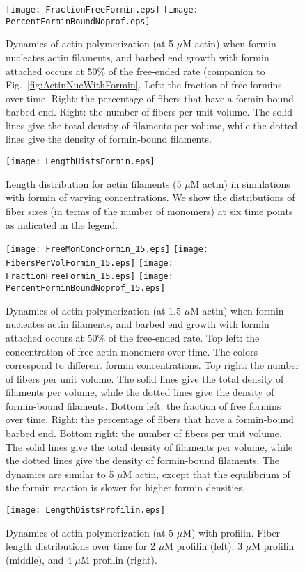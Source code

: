 \documentclass[11pt]{article}
\begin{document}
\begin{appendices}
\begin{figure}
\centering
\texttt{[image: FractionFreeFormin.eps]}
\texttt{[image: PercentForminBoundNoprof.eps]}
\caption{Dynamics of actin polymerization (at 5 $\mu$M actin) when formin nucleates actin filaments, and barbed end growth with formin attached occurs at 50\% of the free-ended rate (companion to Fig.\ \ref{fig:ActinNucWithFormin}. Left: the fraction of free formins over time. Right: the percentage of fibers that have a formin-bound barbed end. Right: the number of fibers per unit volume. The solid lines give the total density of filaments per volume, while the dotted lines give the density of formin-bound filaments.}
\end{figure}


\begin{figure}
\centering
\texttt{[image: LengthHistsFormin.eps]}
\caption{\label{fig:HistsWithFormin}Length distribution for actin filaments (5 $\mu$M actin) in simulations with formin of varying concentrations. We show the distributions of fiber sizes (in terms of the number of monomers) at six time points as indicated in the legend.}
\end{figure}

\begin{figure}
\centering
\texttt{[image: FreeMonConcFormin\_15.eps]}
\texttt{[image: FibersPerVolFormin\_15.eps]}
\texttt{[image: FractionFreeFormin\_15.eps]}
\texttt{[image: PercentForminBoundNoprof\_15.eps]}
\caption{\label{fig:ActinLowNucWithFormin}Dynamics of actin polymerization (at 1.5 $\mu$M actin) when formin nucleates actin filaments, and barbed end growth with formin attached occurs at 50\% of the free-ended rate. Top left: the concentration of free actin monomers over time. The colors correspond to different formin concentrations. Top right: the number of fibers per unit volume. The solid lines give the total density of filaments per volume, while the dotted lines give the density of formin-bound filaments. Bottom left: the fraction of free formins over time. Right: the percentage of fibers that have a formin-bound barbed end. Bottom right: the number of fibers per unit volume. The solid lines give the total density of filaments per volume, while the dotted lines give the density of formin-bound filaments. The dynamics are similar to 5 $\mu$M actin, except that the equilibrium of the formin reaction is slower for higher formin densities.}
\end{figure}



\begin{figure}
\centering
\texttt{[image: LengthDistsProfilin.eps]}
\caption{\label{fig:ActinProfilin}Dynamics of actin polymerization (at 5 $\mu$M) with profilin. Fiber length distributions over time for 2 $\mu$M profilin (left), 3 $\mu$M profilin (middle), and 4 $\mu$M profilin (right).}
\end{figure}

\end{appendices}






\end{document}
